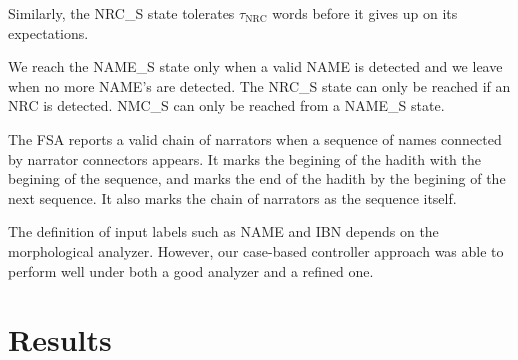 \documentclass[11pt,letterpaper]{article}
\begin{document}
\begin{figure}[tb!]
\end{figure}

Similarly, the NRC\_S state tolerates $\tau_{\mbox{NRC}}$ words 
before it gives up on its expectations. 

We reach the NAME\_S state only when a
valid NAME is detected and we leave when no more NAME's are detected. 
The NRC\_S state can only be reached if an NRC is detected.
NMC\_S can only be reached from a NAME\_S state.

The FSA reports a valid chain of narrators when a sequence of names
connected by narrator connectors appears. 
It marks the begining of the hadith with the begining of the sequence,
and marks the end of the hadith by the begining of the next sequence. 
It also marks the chain of narrators as the sequence itself. 

The definition of input labels such as NAME and IBN depends on the 
morphological analyzer. 
However, our case-based controller approach was able to perform well
under both a good analyzer and a refined one. 


\section{Results}
\label{sec:results}
\end{document}
